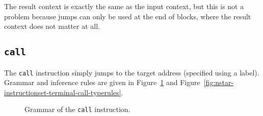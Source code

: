 The result context is exactly the same as the input context, but this is not a problem because jumps can only be used at the end of blocks, where the result context does not matter at all.

\subsection{\texttt{call}}\label{subsec:nstar-instructionset-terminal-call}

The \texttt{call} instruction simply jumps to the target address (specified using a label).
Grammar and inference rules are given in Figure~\ref{fig:nstar-instructionset-terminal-call-grammar} and Figure~\ref{fig:nstar-instructionset-terminal-call-typerules}.

\begin{figure}[H]
  \centering


  \caption{Grammar of the \texttt{call} instruction.}
  \label{fig:nstar-instructionset-terminal-call-grammar}
\end{figure}

